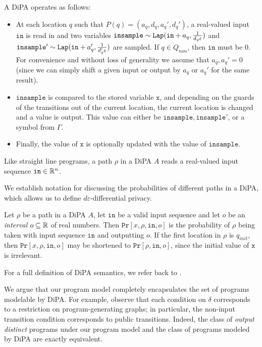 A DiPA operates as follows: 
\begin{itemize}
    \item At each location $q$ such that $P(q) = (a_q, d_q, a_q', d_q')$, a real-valued input $\texttt{in}$ is read in and two variables $\texttt{insample}\sim \texttt{Lap}(\texttt{in}+a_q, \frac{1}{d_q\varepsilon})$ and $\texttt{insample}'\sim\texttt{Lap}(\texttt{in}+a_q', \frac{1}{d_q'\varepsilon})$ are sampled. If $q\in Q_{non}$, then $\texttt{in}$ must be 0. 
    For convenience and without loss of generality we assume that $a_q, a_q' =0$ (since we can simply shift a given input or output by $a_q$ or $a_q'$ for the same result).
    \item $\texttt{insample}$ is compared to the stored variable $\texttt{x}$, and depending on the guards of the transitions out of the current location, the current location is changed and a value is output. This value can either be $\texttt{insample}, \texttt{insample}'$, or a symbol from $\Gamma$.
    \item Finally, the  value of $\texttt{x}$ is optionally updated with the value of $\texttt{insample}$.
\end{itemize}

Like straight line programs, a path $\rho$ in a DiPA $A$ reads a real-valued input sequence $\texttt{in}\in \mathbb{R}^n$.

We establish notation for discussing the probabilities of different paths in a DiPA, which allows us to define $d\varepsilon$-differential privacy. 

\begin{defn} 
    Let $\rho$ be a path in a DiPA $A$, let $\texttt{in}$ be a valid input sequence and let $o$ be an \textit{interval} $o\subseteq \mathbb{R}$ of real numbers.
    Then $\texttt{Pr}[x, \rho, \texttt{in}, o]$ is the probability of $\rho$ being taken with input sequence $\texttt{in}$ and outputting $o$. If the first location in $\rho$ is $q_{init}$, then $\texttt{Pr}[x, \rho, \texttt{in}, o]$ may be shortened to $\texttt{Pr}[\rho, \texttt{in}, o]$, since the initial value of $\texttt{x}$ is irrelevant.
\end{defn}

For a full definition of DiPA semantics, we refer back to \cite{chadhaLinearTimeDecidability2021}. 

We argue that our program model completely encapsulates the set of programs modelable by DiPA. 
For example, observe that each condition on $\delta$ corresponds to a restriction on program-generating graphs; in particular, the non-input transition condition corresponds to public transitions. 
Indeed, the class of \textit{output distinct} programs under our program model and the class of programs modeled by DiPA are exactly equivalent. 

